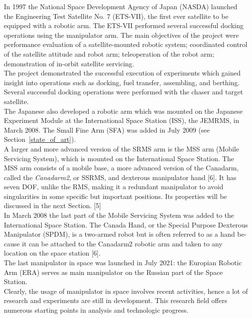 \documentclass[a4paper,12pt,oneside]{report}
\begin{document}
In 1997 the National Space Development Agency of Japan (NASDA) launched the Engineering Test Satellite No. 7 (ETS-VII), the first ever satellite to be equipped with a robotic arm. The ETS-VII performed several successful docking operations using the manipulator arm. The main objectives of the project were performance evaluation of a satellite-mounted robotic system; coordinated control of the satellite attitude and robot arm; teleoperation of the robot arm; demonstration of in-orbit satellite servicing.\\
The project demonstrated the successful execution of experiments which gained insight into operations such as docking, fuel transfer, assembling, and berthing. Several successful docking operations were performed with the chaser and target satellite.\\
The Japanese also developed a robotic arm which was mounted on the Japanese Experiment Module at the International Space Station (ISS), the JEMRMS, in March 2008. The Small Fine Arm (SFA) was added in July 2009 (see Section~\ref{state_of_art}).\\
A larger and more advanced version of the SRMS arm is the MSS arm (Mobile Servicing System), which is mounted on the International Space Station. The MSS arm consists of a mobile base, a more advanced version of the Canadarm, called the \textit{Canadarm2}, or SSRMS, and dexterous manipulator hand [6]. It has seven DOF, unlike the RMS, making it a redundant manipulator to avoid singularities in some specific but important positions. Its properties will be discussed in the next Section. [5]\\
In March 2008 the last part of the Mobile Servicing System was added to the International Space Station. The Canada Hand, or the Special Purpose Dexterous Manipulator (SPDM), is a two-armed robot but is often referred to as a hand be- cause it can be attached to the Canadarm2 robotic arm and taken to any location on the space station [6].\\
The last manipulator in space was launched in July 2021: the Europian Robotic Arm (ERA) serves as main manipulator on the Russian part of the Space Station.\\
Clearly, the usage of manipulator in space involves recent activities, hence a lot of research and experiments are still in development. This research field offers numerous starting points in analysis and technologic progress.
\newpage
\end{document}
